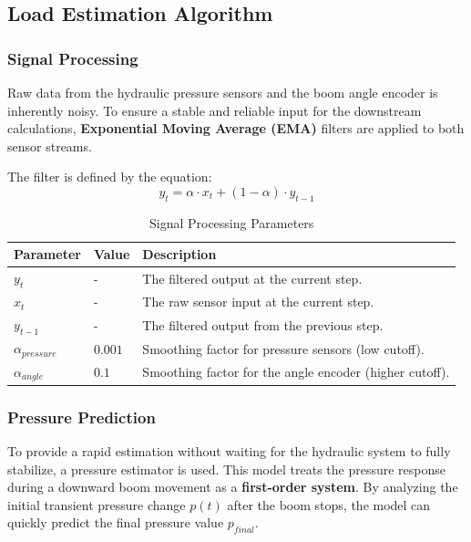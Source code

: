 \documentclass[12pt, a4paper]{article}
\begin{document}
\subsection{Load Estimation Algorithm}

\subsubsection{Signal Processing}
Raw data from the hydraulic pressure sensors and the boom angle encoder is inherently noisy. To ensure a stable and reliable input for the downstream calculations, \textbf{Exponential Moving Average (EMA)} filters are applied to both sensor streams. 

The filter is defined by the equation:
\begin{equation}
    y_t = \alpha \cdot x_t + (1 - \alpha) \cdot y_{t-1}
\end{equation}

\begin{table}[H]
    \centering
    \caption{Signal Processing Parameters}
    \begin{tabular}{l|l|l}
        \hline
        \textbf{Parameter} & \textbf{Value} & \textbf{Description} \\
        \hline
        $y_t$ & - & The filtered output at the current step. \\
        $x_t$ & - & The raw sensor input at the current step. \\
        $y_{t-1}$ & - & The filtered output from the previous step. \\
        $\alpha_{pressure}$ & $0.001$ & Smoothing factor for pressure sensors (low cutoff). \\
        $\alpha_{angle}$ & $0.1$ & Smoothing factor for the angle encoder (higher cutoff). \\
        \hline
    \end{tabular}
\end{table}

\subsubsection{Pressure Prediction}
To provide a rapid estimation without waiting for the hydraulic system to fully stabilize, a pressure estimator is used. This model treats the pressure response during a downward boom movement as a \textbf{first-order system}. By analyzing the initial transient pressure change $p(t)$ after the boom stops, the model can quickly predict the final pressure value $p_{final}$.
\end{document}
